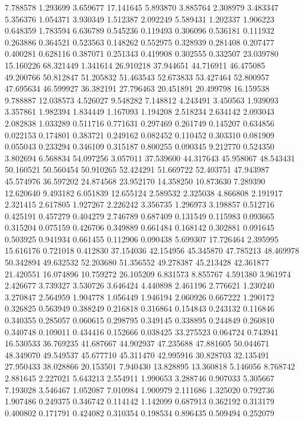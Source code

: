 7.788578
1.293699
3.659677
17.141645
5.893870
3.885764
2.308979
3.483347
5.356376
1.054371
3.930349
1.512387
2.092249
5.589431
1.202337
1.906223
0.648359
1.783594
6.636789
0.545236
0.119493
0.306096
0.536181
0.111932
0.263886
0.364521
0.523563
0.148262
0.552975
0.328939
0.281408
0.207477
0.400281
0.628116
0.387071
0.251343
0.419908
0.302555
0.332507
23.039780
15.160226
68.321449
1.341614
26.910218
37.944651
44.716911
46.475085
49.200766
50.812847
51.205832
51.463543
52.673833
53.427464
52.800957
47.695634
46.599927
36.382191
27.796463
20.451891
20.499798
16.159538
9.788887
12.038573
4.526027
9.548282
7.148812
4.243491
3.450563
1.939093
3.357861
1.982394
1.834449
1.167093
1.194208
2.518234
2.634142
2.093043
2.082838
1.033289
0.511716
0.771631
0.297469
0.261749
0.145207
0.634856
0.022153
0.174801
0.383721
0.249162
0.082452
0.110452
0.303310
0.081909
0.055043
0.233294
0.346109
0.315187
0.800255
0.090345
9.212770
0.524350
3.802694
6.568834
54.097256
3.057011
37.539600
44.317643
45.958067
48.543431
50.160521
50.560454
50.910265
52.424291
51.669722
52.403751
47.943987
45.574976
36.597202
24.874568
23.952170
14.358250
10.873630
7.289390
12.620640
9.493182
6.051839
12.655124
2.589532
2.325038
4.866808
2.191917
2.321415
2.617805
1.927267
2.226242
3.356735
1.296973
3.198857
0.512716
0.425191
0.457279
0.404279
2.746789
0.687409
0.131549
0.115983
0.093665
0.315204
0.075159
0.426706
0.349889
0.661484
0.168142
0.302881
0.091645
0.503925
0.941934
0.661455
0.112906
0.090438
5.699307
17.726464
2.395995
15.616176
0.721018
0.412830
37.154036
42.154956
45.345870
47.785213
48.469978
50.342894
49.632532
52.203680
51.356552
49.278387
45.213428
42.361877
21.420551
16.074896
10.759272
26.105209
6.831573
8.855767
4.591380
3.961974
2.426677
3.739327
3.530726
3.646424
4.440898
2.461196
2.776621
1.230240
3.270847
2.564959
1.904778
1.056449
1.946194
2.060926
0.667222
1.290172
0.326825
0.563949
0.388249
0.216818
0.316864
0.154843
0.243132
0.116846
0.340355
0.285057
0.060615
0.298795
0.349145
0.338895
0.244849
0.260810
0.340748
0.109011
0.434416
0.152666
0.038425
33.275523
0.064724
0.743941
16.530533
36.769235
41.687667
44.902937
47.235688
47.881605
50.044671
48.349070
49.549537
45.677710
45.311470
42.995916
30.828703
32.135491
27.950433
38.028866
20.153501
7.940430
13.828895
13.360818
5.146056
8.768742
2.881645
2.227021
5.643213
2.554911
1.990653
3.288746
0.907033
5.305667
7.193028
3.546467
1.052087
7.010984
1.900979
2.111686
1.325020
0.792736
1.907486
0.249375
0.346742
0.114142
1.142099
0.687913
0.362192
0.313179
0.400802
0.171791
0.424082
0.310354
0.198534
0.896435
0.509494
0.252079

